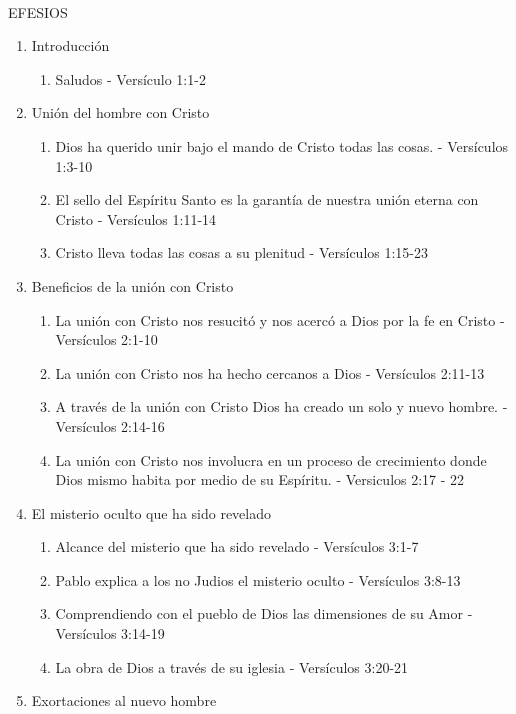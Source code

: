\documentclass[9pt,letterpaper]{article}
\author{Ciencias}
\begin{document}
	\\
	{\large EFESIOS}\\
	
	\begin{enumerate}
		\item {\large Introducción}
		\begin{enumerate}
			\item Saludos  - Versículo 1:1-2
		\end{enumerate}
		\item  {\large Unión del hombre con Cristo}
		\begin{enumerate}
			\item Dios ha querido unir bajo el mando de Cristo todas las cosas. - Versículos 1:3-10
			\item El sello del Espíritu Santo es la garantía de nuestra unión eterna con Cristo - Versículos 1:11-14
			\item Cristo lleva todas las cosas a su plenitud - Versículos 1:15-23
		\end{enumerate}
		\item {\large Beneficios de la unión con Cristo}
		\begin{enumerate}
			\item La unión con Cristo nos resucitó y nos acercó a Dios por la fe en Cristo - Versículos 2:1-10
			\item La unión con Cristo nos ha hecho cercanos a Dios - Versículos 2:11-13
			\item A través de la unión con Cristo Dios ha creado un solo y nuevo hombre. - Versículos 2:14-16
			\item La unión con Cristo nos involucra en un proceso de crecimiento donde Dios mismo habita por medio de su Espíritu. - Versiculos 2:17 - 22
		\end{enumerate}
		\item {\large El misterio oculto que ha sido revelado}
		\begin{enumerate}
			\item Alcance del misterio que ha sido revelado - Versículos 3:1-7
			\item Pablo explica a los no Judios el misterio oculto - Versículos 3:8-13
			\item Comprendiendo con el pueblo de Dios las dimensiones de su Amor - Versículos 3:14-19
			\item La obra de Dios a través de su iglesia - Versículos 3:20-21
		\end{enumerate}
		\item {\large Exortaciones al nuevo hombre}

\end{enumerate}
\end{document}
